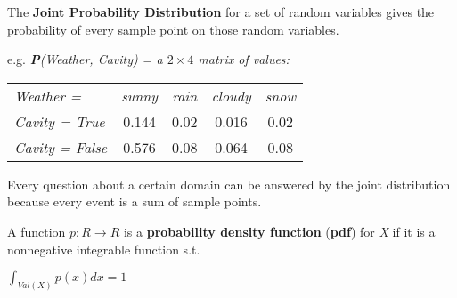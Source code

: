 \begin{definition}
    The \textbf{Joint Probability Distribution} for a set of random variables gives the probability of every sample point on those random variables. \vspace{3.5pt}

    e.g. \textit{\textbf{P}(Weather, Cavity) = a $2\times4$ matrix of values:}
    \begin{center}
        \begin{table}[H]
            \centering
            \begin{tabular}{|l|c|c|c|c|}
                \hline
                \it Weather = & \it sunny & \it rain & \it cloudy & \it snow \\
                \cline{1-5}
                \it Cavity = True & 0.144 & 0.02 & 0.016 & 0.02 \\
                \it Cavity = False & 0.576 & 0.08 & 0.064 & 0.08 \\
                \hline
            \end{tabular}
        \end{table}
    \end{center}
    Every question about a certain domain can be answered by the joint distribution because every event is a sum of sample points.
\end{definition}
\begin{definition}
    A function $p:R \rightarrow R$ is a \textbf{probability density function} (\textbf{pdf}) for \textit{X} if it is a nonnegative integrable function s.t. \vspace{3.5pt}

    \begin{center}
        $\int_{Val(X)} p(x)dx = 1$
    \end{center}
\end{definition}
